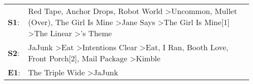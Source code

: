 \begin{supertabular}{p{0.03\textwidth}p{0.92\textwidth}}
 \textbf{S1}:  &  Red Tape\textsuperscript{}, \enspace Anchor Drops\textsuperscript{}, \enspace Robot World\textsuperscript{} \textgreater \enspace Uncommon\textsuperscript{}, \enspace Mullet (Over)\textsuperscript{}, \enspace The Girl Is Mine\textsuperscript{} \textgreater \enspace Jane Says\textsuperscript{} \textgreater \enspace The Girl Is Mine[1]\textsuperscript{} \textgreater \enspace The Linear\textsuperscript{} \textgreater {}'s Theme\textsuperscript{}  \enspace  \\
 \textbf{S2}:  &                                                                                    JaJunk\textsuperscript{} \textgreater \enspace Eat\textsuperscript{} \textgreater \enspace Intentions Clear\textsuperscript{} \textgreater \enspace Eat\textsuperscript{}, \enspace I Ran\textsuperscript{}, \enspace Booth Love\textsuperscript{}, \enspace Front Porch[2]\textsuperscript{}, \enspace Mail Package\textsuperscript{} \textgreater \enspace Kimble\textsuperscript{}  \enspace  \\
 \textbf{E1}:  &                                                                                                                                                                                                                                                                                                                                                                                         The Triple Wide\textsuperscript{} \textgreater \enspace JaJunk\textsuperscript{}  \enspace  \\
\end{supertabular}
